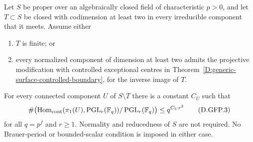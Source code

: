 \begin{corollary}
\label{D:global-projective-finite-puncture-closure}
Let $S$ be proper over an algebraically closed field of characteristic
$p>0$, and let $T\subset S$ be closed with codimension at least two
in every irreducible component that it meets. Assume either
\begin{enumerate}
\item $T$ is finite; or
\item every normalized component of dimension at least two admits
the projective modification with controlled exceptional centres
in Theorem~\ref{D:generic-surface-controlled-boundary}, for the
inverse image of $T$.
\end{enumerate}
For every connected component $U$ of $S\setminus T$ there is a
constant $C_U$ such that
\[
 \#\bigl(\operatorname{Hom}_{\rm cont}
      (\pi_1(U),\operatorname{PGL}_r(\mathbb F_q))
                 /\operatorname{PGL}_r(\mathbb F_q)\bigr)
                            \leq q^{C_Ur^2}             \tag{D.GFP.3}
\]
for all $q=p^f$ and $r\geq1$. Normality and reducedness of $S$
are not required. No Brauer-period or bounded-scalar condition is
imposed in either case.
\end{corollary}

